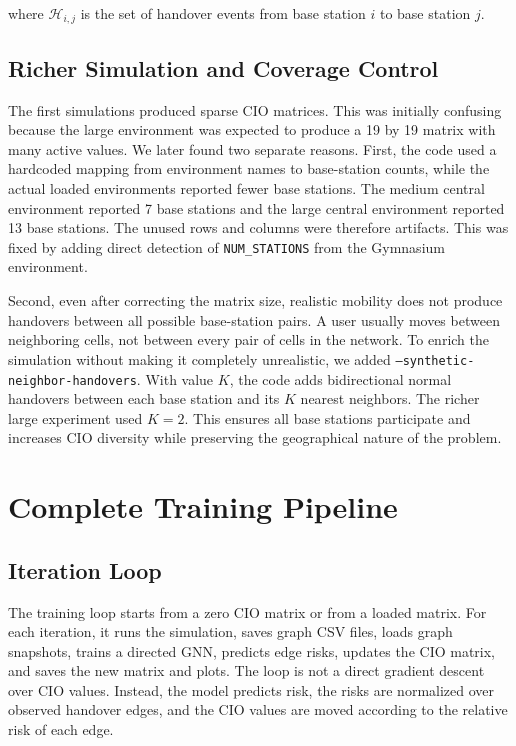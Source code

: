 \documentclass[11pt, a4paper, twoside]{article}
\begin{document}
where $\mathcal{H}_{i,j}$ is the set of handover events from base station $i$ to base station $j$.

\subsection{Richer Simulation and Coverage Control}

The first simulations produced sparse CIO matrices. This was initially confusing because the large environment was expected to produce a 19 by 19 matrix with many active values. We later found two separate reasons. First, the code used a hardcoded mapping from environment names to base-station counts, while the actual loaded environments reported fewer base stations. The medium central environment reported 7 base stations and the large central environment reported 13 base stations. The unused rows and columns were therefore artifacts. This was fixed by adding direct detection of \texttt{NUM\_STATIONS} from the Gymnasium environment.

Second, even after correcting the matrix size, realistic mobility does not produce handovers between all possible base-station pairs. A user usually moves between neighboring cells, not between every pair of cells in the network. To enrich the simulation without making it completely unrealistic, we added \texttt{--synthetic-neighbor-handovers}. With value $K$, the code adds bidirectional normal handovers between each base station and its $K$ nearest neighbors. The richer large experiment used $K=2$. This ensures all base stations participate and increases CIO diversity while preserving the geographical nature of the problem.

\section{Complete Training Pipeline}
\label{sec:training_pipeline}

\subsection{Iteration Loop}

The training loop starts from a zero CIO matrix or from a loaded matrix. For each iteration, it runs the simulation, saves graph CSV files, loads graph snapshots, trains a directed GNN, predicts edge risks, updates the CIO matrix, and saves the new matrix and plots. The loop is not a direct gradient descent over CIO values. Instead, the model predicts risk, the risks are normalized over observed handover edges, and the CIO values are moved according to the relative risk of each edge.
\end{document}
